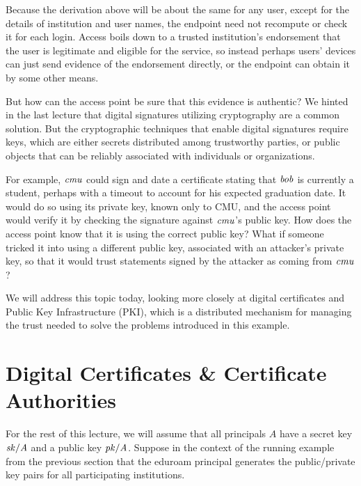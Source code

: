 \documentclass[11pt]{article}
\begin{document}
Because the derivation above will be about the same for any user,
except for the details of institution and user names, the endpoint
need not recompute or check it for each login. Access boils down to a
trusted institution's endorsement that the user is legitimate and
eligible for the service, so instead perhaps users' devices can just
send evidence of the endorsement directly, or the endpoint can obtain
it by some other means.

But how can the access point be sure that this evidence is authentic?
We hinted in the last lecture that digital signatures utilizing
cryptography are a common solution. But the cryptographic techniques
that enable digital signatures require keys, which are either
secrets distributed among trustworthy parties, or public objects that
can be reliably associated with individuals or organizations.

For example, $\mathit{cmu}$ could sign and date a certificate stating that
$\mathit{bob}$ is currently a student, perhaps with a timeout to account for his
expected graduation date. It would do so using its private key, known
only to CMU, and the access point would verify it by checking the signature
against $\mathit{cmu}$'s public key. How does the access point know that it
is using the correct public key? What if someone tricked it into using a
different public key, associated with an attacker's private key, so that it
would trust statements signed by the attacker as coming from $\mathit{cmu}$?

We will address this topic today, looking more closely at digital
certificates and Public Key Infrastructure (PKI), which is a
distributed mechanism for managing the trust needed to solve the
problems introduced in this example.

\section{Digital Certificates \& Certificate Authorities}

\newcommand{\sk}[1]{\ensuremath{\mi{sk/#1}}}
\newcommand{\pk}[1]{\ensuremath{\mi{pk/#1}}}

\newcommand{\sign}[1]{\ms{sign}_{#1}}
\newcommand{\verify}[1]{\ms{verify}_{#1}}
\newcommand{\cert}[2]{\ms{cert}_{{#1} \arrow {#2}}}
\newcommand{\enc}[1]{\ms{enc}_{{#1}}}

For the rest of this lecture, we will assume that all principals $A$ have a
secret key \sk{A} and a public key \pk{A}. Suppose in the context of the running
example from the previous section that the eduroam principal generates the
public/private key pairs for all participating institutions.
\end{document}
